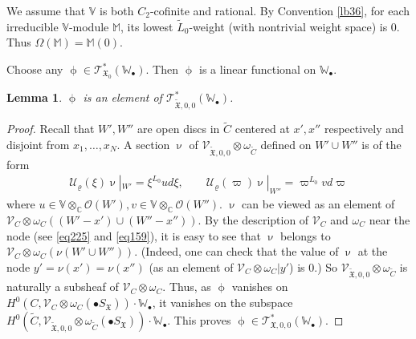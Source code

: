 \documentclass[12pt,a4paper,notitlepage]{report}
\theoremstyle{definition}
\theoremstyle{plain}
\newtheorem{lm}[df]{Lemma}
\newcommand{\fk}{\mathfrak}
\newcommand{\mc}{\mathcal}
\newcommand{\wtd}{\widetilde}
\newcommand{\scr}{\mathscr}
\newcommand{\SX}{S_{\fk X}}
\newcommand{\blt}{\bullet}
\newcommand{\Vbb}{\mathbb V}
\newcommand{\Wbb}{\mathbb W}
\newcommand{\Mbb}{\mathbb M}
\newcommand{\Cbb}{\mathbb C}
\numberwithin{equation}{section}
\begin{document}
We assume  that $\Vbb$ is both $C_2$-cofinite and rational. By Convention \ref{lb36}, for each irreducible $\Vbb$-module $\Mbb$,  its lowest $\wtd L_0$-weight (with nontrivial weight space) is $0$. Thus $\Omega(\Mbb)=\Mbb(0)$.

Choose any $\upphi\in\scr T_{\fk X_0}^*(\Wbb_\blt)$. Then $\upphi$ is a linear functional on $\Wbb_\blt$.


\begin{lm}
$\upphi$ is an element of $\scr T_{\wtd{\fk X},0,0}^*(\Wbb_\blt)$.
\end{lm}



\begin{proof}
Recall that $W',W''$ are open discs in $\wtd C$ centered at $x',x''$  respectively and disjoint from $x_1,\dots,x_N$. A section $\upnu$ of $\scr V_{\wtd{\fk X},0,0}\otimes\omega_{\wtd C}$ defined on $W'\cup W''$	is of the form
\begin{gather*}
\mc U_\varrho(\xi)\upnu|_{W'}=\xi^{L_0}ud\xi,\qquad \mc U_\varrho(\varpi)\upnu|_{W''}=\varpi^{L_0}vd\varpi
\end{gather*}
where $u\in\Vbb\otimes_\Cbb\scr O(W'),v\in\Vbb\otimes_\Cbb\scr O(W'')$.   $\upnu$ can be viewed as 	an element of $\scr V_C\otimes\omega_C((W'-x')\cup (W''-x''))$. By the description of $\scr V_C$ and $\omega_C$ near the node (see \eqref{eq225} and \eqref{eq159}), it is easy to see that $\upnu$ belongs to $\scr V_C\otimes\omega_C(\nu(W'\cup W''))$. (Indeed, one can check that the value of $\upnu$ at the node $y'=\nu(x')=\nu(x'')$ (as an element of $\scr V_C\otimes\omega_C|y'$) is $0$.) So $\scr V_{\wtd{\fk X},0,0}\otimes\omega_{\wtd C}$ is naturally a subsheaf of $\scr V_C\otimes\omega_C$. Thus, as $\upphi$ vanishes on $H^0(C,\scr V_C\otimes\omega_C(\blt\SX))\cdot \Wbb_\blt$, it vanishes on the subspace $H^0(\wtd C,\scr V_{\wtd{\fk X},0,0}\otimes\omega_{\wtd C}(\blt\SX))\cdot \Wbb_\blt$. This proves $\upphi\in\scr T_{\fk X,0,0}^*(\Wbb_\blt)$.
\end{proof}	
\end{document}
